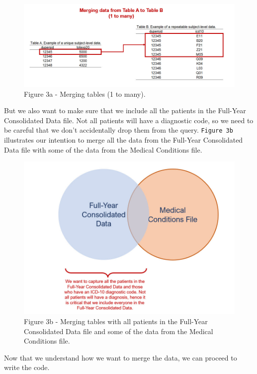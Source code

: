 \documentclass[
]{book}
\begin{document}
\begin{figure}
\includegraphics[width=1\linewidth]{Figure 2_3a} \caption{Figure 3a - Merging tables (1 to many).}\label{fig:unnamed-chunk-11}
\end{figure}

But we also want to make sure that we include all the patients in the Full-Year Consolidated Data file. Not all patients will have a diagnostic code, so we need to be careful that we don't accidentally drop them from the query. \texttt{Figure\ 3b} illustrates our intention to merge all the data from the Full-Year Consolidated Data file with some of the data from the Medical Conditions file.

\begin{figure}
\includegraphics[width=1\linewidth]{Figure 2_3b} \caption{Figure 3b - Merging tables with all patients in the Full-Year Consolidated Data file and some of the data from the Medical Conditions file.}\label{fig:unnamed-chunk-12}
\end{figure}

Now that we understand how we want to merge the data, we can proceed to write the code.
\end{document}
